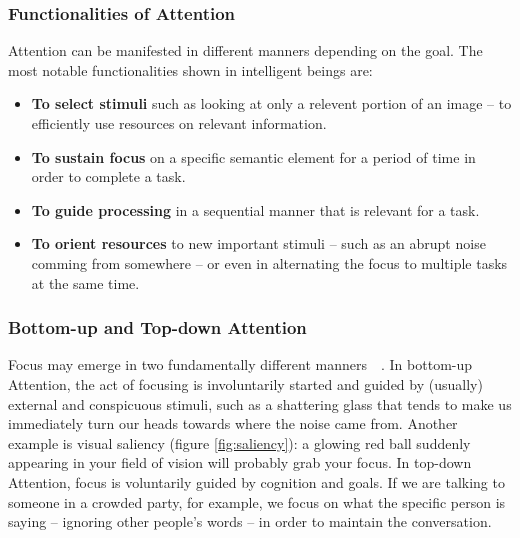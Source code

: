 \documentclass[12pt]{article}
\begin{document}
\subsubsection{Functionalities of Attention}
Attention can be manifested in different manners depending on the goal.
The most notable functionalities shown in intelligent beings are:
\begin{itemize}
    \item \textbf{To select stimuli} such as looking at only a relevent portion of an image --
        to efficiently use resources on relevant information.
    \item \textbf{To sustain focus} on a specific semantic element for a period of time in order to complete
        a task.
    \item \textbf{To guide processing} in a sequential manner that is relevant for a task.
    \item \textbf{To orient resources} to new important stimuli
        -- such as an abrupt noise comming from somewhere --
        or even in alternating the focus to multiple tasks at the same time.
\end{itemize}

\subsubsection{Bottom-up and Top-down Attention}
\label{bu-td}
Focus may emerge in two fundamentally different manners~\cite{ref:esther-thesis}~\cite{ref:vocus}.
In bottom-up Attention, the act of focusing is involuntarily
started and guided by (usually) external and conspicuous stimuli,
such as a shattering glass that tends to
make us immediately turn our heads towards where the noise came from.
Another example is visual saliency (figure \ref{fig:saliency}):
a glowing red ball suddenly appearing in
your field of vision will probably grab your focus.
In top-down Attention, focus is voluntarily guided by cognition and goals.
If we are talking to someone in a crowded party, for example,
we focus on what the specific person is saying
-- ignoring other people's words -- in order to maintain the conversation.
\end{document}
